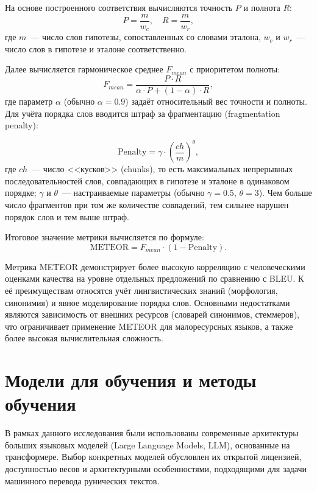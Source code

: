 \documentclass[14pt,a4paper]{extreport}
\begin{document}
На основе построенного соответствия вычисляются точность $P$ и полнота $R$:
\begin{equation}
P = \frac{m}{w_c}, \quad R = \frac{m}{w_r},
\end{equation}
где $m$~--- число слов гипотезы, сопоставленных со словами эталона, $w_c$ и $w_r$~--- число слов в гипотезе и эталоне соответственно.

Далее вычисляется гармоническое среднее $F_{mean}$ с приоритетом полноты:
\begin{equation}
F_{mean} = \frac{P \cdot R}{\alpha \cdot P + (1 - \alpha) \cdot R},
\end{equation}
где параметр $\alpha$ (обычно $\alpha = 0.9$) задаёт относительный вес точности и полноты.
Для учёта порядка слов вводится штраф за фрагментацию (fragmentation penalty):

\begin{equation}
\mathrm{Penalty} = \gamma \cdot \left(\frac{ch}{m}\right)^\theta,
\end{equation}
где $ch$~--- число <<кусков>> (chunks), то есть максимальных непрерывных последовательностей слов, совпадающих в гипотезе и эталоне в одинаковом порядке; $\gamma$ и $\theta$~--- настраиваемые параметры (обычно $\gamma = 0.5$, $\theta = 3$). Чем больше число фрагментов при том же количестве совпадений, тем сильнее нарушен порядок слов и тем выше штраф.

Итоговое значение метрики вычисляется по формуле:
\begin{equation}
\mathrm{METEOR} = F_{mean} \cdot (1 - \mathrm{Penalty}).
\end{equation}


Метрика METEOR демонстрирует более высокую корреляцию с человеческими оценками качества на уровне отдельных предложений по сравнению с BLEU. К её преимуществам относятся учёт лингвистических знаний (морфология, синонимия) и явное моделирование порядка слов. Основными недостатками являются зависимость от внешних ресурсов (словарей синонимов, стеммеров), что ограничивает применение METEOR для малоресурсных языков, а также более высокая вычислительная сложность.

\section{Модели для обучения и методы обучения}

В рамках данного исследования были использованы современные архитектуры больших языковых моделей (Large Language Models, LLM), основанные на трансформере. Выбор конкретных моделей обусловлен их открытой лицензией, доступностью весов и архитектурными особенностями, подходящими для задачи машинного перевода рунических текстов.
\end{document}
